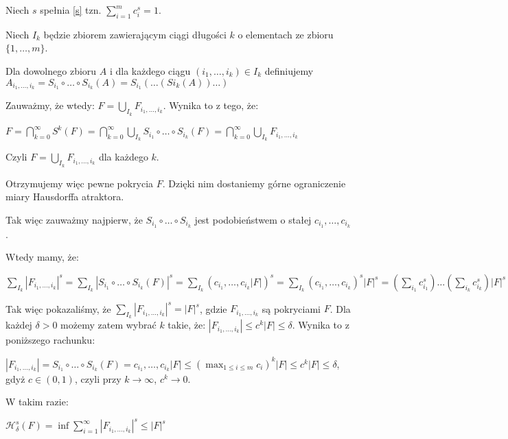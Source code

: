 \documentclass{mini}
\begin{document}

\begin{dow}

Niech $s$ spełnia \eqref{s} tzn. $\sum^m_{i=1}c_i^s=1$. 

Niech $I_k$ będzie zbiorem zawierającym ciągi długości $k$ o elementach ze zbioru $\lbrace 1,\ldots,m\rbrace$.

Dla dowolnego zbioru $A$ i dla każdego ciągu $(i_1,\ldots,i_k)\in I_k$ definiujemy\\ \mbox{$A_{i_1,\ldots,i_k}=S_{i_1}\circ\ldots\circ S_{i_k}(A)=S_{i_1}(\ldots(S{i_k}(A))\ldots)$}

Zauważmy, że wtedy:   $F=\bigcup_{I_k}F_{i_1,\ldots,i_k}$. Wynika to z tego, że:

$F=\bigcap^{\infty}_{k=0}S^k(F)=\bigcap^{\infty}_{k=0}\bigcup_{I_k} S_{i_1}\circ\ldots\circ S_{i_k}(F)=\bigcap^{\infty}_{k=0}\bigcup_{I_k}F_{i_1,\ldots,i_k}$

Czyli $F=\bigcup_{I_k}F_{i_1,\ldots,i_k}$ dla każdego $k$.

Otrzymujemy więc pewne pokrycia $F$. Dzięki nim dostaniemy górne ograniczenie miary Hausdorffa atraktora. 

Tak więc zauważmy najpierw, że $S_{i_1}\circ\ldots\circ S_{i_k}$ jest podobieństwem o stałej $c_{i_1},\ldots,c_{i_k}$.

Wtedy mamy, że:

$\sum_{I_k}|F_{i_1,\ldots,i_k}|^s=\sum_{I_k}|S_{i_1}\circ\ldots\circ S_{i_k}(F)|^s=\sum_{I_k}(c_{i_1},\ldots,c_{i_k}|F|)^s= \sum_{I_k}(c_{i_1},\ldots,c_{i_k})^s{|F|}^s = (\sum_{i_1}c_{i_1}^s) \ldots(\sum_{i_k}c_{i_k}^s)|F|^s=1\cdot\ldots\cdot1\cdot|F|^s=|F|^s$

Tak więc pokazaliśmy, że $\sum_{I_k}|F_{i_1,\ldots,i_k}|^s=|F|^s$, gdzie $F_{i_1,\ldots,i_k}$ są pokryciami $F$. Dla każdej $\delta>0$ możemy zatem wybrać $k$ takie, że: $|F_{i_1,\ldots,i_k}|\leqslant c^k|F|\leqslant\delta$. Wynika to z poniższego rachunku:

$|F_{i_1,\ldots,i_k}|=S_{i_1}\circ\ldots\circ S_{i_k}(F)=c_{i_1},\ldots,c_{i_k}|F| \leqslant (\max_{1\leqslant i\leqslant m}{c_i})^k|F|\leqslant c^k|F|\leqslant\delta$, gdyż $c \in (0,1)$, czyli przy $k\rightarrow\infty$, $c^k\longrightarrow0$.

W takim razie:

$\mathcal{H}^s_{\delta}(F)=\inf \sum^{\infty}_{i=1}|F_{i_1,\ldots,i_k}|^s\leqslant|F|^s$


\end{dow}
\end{document}
